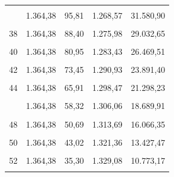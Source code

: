 \begin{longtable}[t]{rrrrr}
\cellcolor{gray!10}{35} & \cellcolor{gray!10}{1.364,38} & \cellcolor{gray!10}{99,50} & \cellcolor{gray!10}{1.264,88} & \cellcolor{gray!10}{32.849,47}\\
\addlinespace
36 & 1.364,38 & 95,81 & 1.268,57 & 31.580,90\\
\cellcolor{gray!10}{37} & \cellcolor{gray!10}{1.364,38} & \cellcolor{gray!10}{92,11} & \cellcolor{gray!10}{1.272,27} & \cellcolor{gray!10}{30.308,63}\\
38 & 1.364,38 & 88,40 & 1.275,98 & 29.032,65\\
\cellcolor{gray!10}{39} & \cellcolor{gray!10}{1.364,38} & \cellcolor{gray!10}{84,68} & \cellcolor{gray!10}{1.279,70} & \cellcolor{gray!10}{27.752,95}\\
40 & 1.364,38 & 80,95 & 1.283,43 & 26.469,51\\
\addlinespace
\cellcolor{gray!10}{41} & \cellcolor{gray!10}{1.364,38} & \cellcolor{gray!10}{77,20} & \cellcolor{gray!10}{1.287,18} & \cellcolor{gray!10}{25.182,33}\\
42 & 1.364,38 & 73,45 & 1.290,93 & 23.891,40\\
\cellcolor{gray!10}{43} & \cellcolor{gray!10}{1.364,38} & \cellcolor{gray!10}{69,68} & \cellcolor{gray!10}{1.294,70} & \cellcolor{gray!10}{22.596,70}\\
44 & 1.364,38 & 65,91 & 1.298,47 & 21.298,23\\
\cellcolor{gray!10}{45} & \cellcolor{gray!10}{1.364,38} & \cellcolor{gray!10}{62,12} & \cellcolor{gray!10}{1.302,26} & \cellcolor{gray!10}{19.995,97}\\
\addlinespace
46 & 1.364,38 & 58,32 & 1.306,06 & 18.689,91\\
\cellcolor{gray!10}{47} & \cellcolor{gray!10}{1.364,38} & \cellcolor{gray!10}{54,51} & \cellcolor{gray!10}{1.309,87} & \cellcolor{gray!10}{17.380,04}\\
48 & 1.364,38 & 50,69 & 1.313,69 & 16.066,35\\
\cellcolor{gray!10}{49} & \cellcolor{gray!10}{1.364,38} & \cellcolor{gray!10}{46,86} & \cellcolor{gray!10}{1.317,52} & \cellcolor{gray!10}{14.748,83}\\
50 & 1.364,38 & 43,02 & 1.321,36 & 13.427,47\\
\addlinespace
\cellcolor{gray!10}{51} & \cellcolor{gray!10}{1.364,38} & \cellcolor{gray!10}{39,16} & \cellcolor{gray!10}{1.325,22} & \cellcolor{gray!10}{12.102,25}\\
52 & 1.364,38 & 35,30 & 1.329,08 & 10.773,17\\
\cellcolor{gray!10}{53} & \cellcolor{gray!10}{1.364,38} & \cellcolor{gray!10}{31,42} & \cellcolor{gray!10}{1.332,96} & \cellcolor{gray!10}{9.440,21}\\

\end{longtable}
